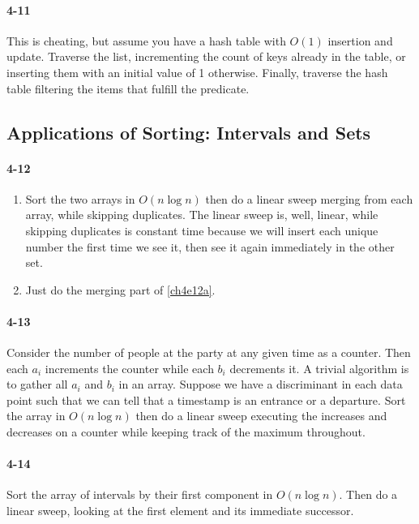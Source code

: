 \documentclass{report}
\begin{document}
\paragraph{4-11} This is cheating, but assume you have a hash table with $O(1)$ insertion and update. Traverse the list, incrementing the count of keys already in the table, or inserting them with an initial value of 1 otherwise. Finally, traverse the hash table filtering the items that fulfill the predicate.

\subsection*{Applications of Sorting: Intervals and Sets}

\paragraph{4-12}
\begin{enumerate}[label=(\alph*)]
	\item Sort the two arrays in $O(n\log n)$ then do a linear sweep merging from each array, while skipping duplicates. The linear sweep is, well, linear, while skipping duplicates is constant time because we will insert each unique number the first time we see it, then see it again immediately in the other set. \label{ch4e12a}
	\item Just do the merging part of \ref{ch4e12a}.
\end{enumerate}

\paragraph{4-13} Consider the number of people at the party at any given time as a counter. Then each $a_i$ increments the counter while each $b_i$ decrements it. A trivial algorithm is to gather all $a_i$ and $b_i$ in an array. Suppose we have a discriminant in each data point such that we can tell that a timestamp is an entrance or a departure. Sort the array in $O(n\log n)$ then do a linear sweep executing the increases and decreases on a counter while keeping track of the maximum throughout.

\paragraph{4-14} Sort the array of intervals by their first component in $O(n\log n)$. Then do a linear sweep, looking at the first element and its immediate successor.
\end{document}
